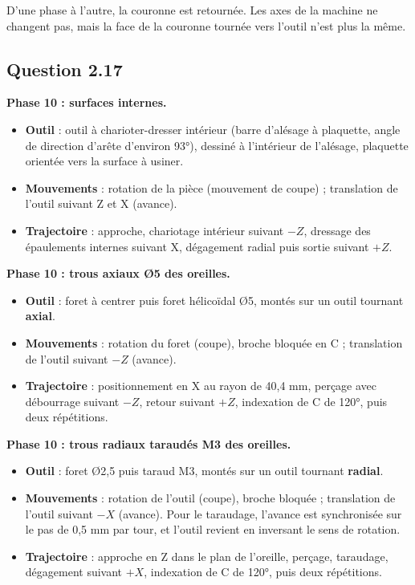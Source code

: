 \documentclass[11pt,a4paper]{article}
\providecommand{\tightlist}{\setlength{\itemsep}{0pt}\setlength{\parskip}{0pt}}
\begin{document}
D'une phase à l'autre, la couronne est retournée. Les axes de la machine ne changent pas, mais la face de la couronne tournée vers l'outil n'est plus la même.

\hypertarget{question-2.17}{%
\subsection{Question 2.17}\label{question-2.17}}

\textbf{Phase 10 : surfaces internes.}

\begin{itemize}
\tightlist
\item
  \textbf{Outil} : outil à charioter-dresser intérieur (barre d'alésage à plaquette, angle de direction d'arête d'environ 93°), dessiné à l'intérieur de l'alésage, plaquette orientée vers la surface à usiner.
\item
  \textbf{Mouvements} : rotation de la pièce (mouvement de coupe) ; translation de l'outil suivant Z et X (avance).
\item
  \textbf{Trajectoire} : approche, chariotage intérieur suivant \(-Z\), dressage des épaulements internes suivant X, dégagement radial puis sortie suivant \(+Z\).
\end{itemize}

\textbf{Phase 10 : trous axiaux Ø5 des oreilles.}

\begin{itemize}
\tightlist
\item
  \textbf{Outil} : foret à centrer puis foret hélicoïdal Ø5, montés sur un outil tournant \textbf{axial}.
\item
  \textbf{Mouvements} : rotation du foret (coupe), broche bloquée en C ; translation de l'outil suivant \(-Z\) (avance).
\item
  \textbf{Trajectoire} : positionnement en X au rayon de 40,4 mm, perçage avec débourrage suivant \(-Z\), retour suivant \(+Z\), indexation de C de 120°, puis deux répétitions.
\end{itemize}

\textbf{Phase 10 : trous radiaux taraudés M3 des oreilles.}

\begin{itemize}
\tightlist
\item
  \textbf{Outil} : foret Ø2,5 puis taraud M3, montés sur un outil tournant \textbf{radial}.
\item
  \textbf{Mouvements} : rotation de l'outil (coupe), broche bloquée ; translation de l'outil suivant \(-X\) (avance). Pour le taraudage, l'avance est synchronisée sur le pas de 0,5 mm par tour, et l'outil revient en inversant le sens de rotation.
\item
  \textbf{Trajectoire} : approche en Z dans le plan de l'oreille, perçage, taraudage, dégagement suivant \(+X\), indexation de C de 120°, puis deux répétitions.
\end{itemize}
\end{document}
